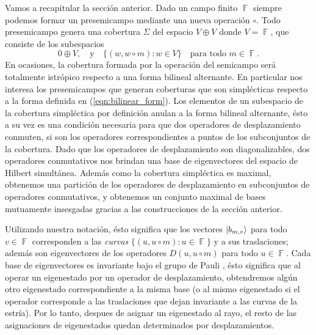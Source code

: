 \documentclass[a4paper,11pt]{report}
\DeclareMathOperator{\F}{\mathbb{F}}
\begin{document}
  Vamos a recapitular la sección anterior. Dado un campo
  finito $\F$ siempre podemos formar un presemicampo
  mediante una nueva operación $\circ$. Todo presemicampo
  genera una cobertura $\Sigma$ del espacio $V \oplus V$
  donde $V = \F$, que consiste de los subespacios
  \[
    0 \oplus V,
    \quad
    \text{y}
    \quad
    \{(w, w \circ m) : w \in V\} 
    \quad \text{para todo } m \in \F.
  \] 
  En ocasiones, la cobertura formada por la operación del
  semicampo será totalmente istrópico respecto a una forma
  bilineal alternante. En particular nos interesa los
  presemicampos que generan coberturas que son simplécticas
  respecto a la forma definida en (\ref{eqn:bilinear_form}).
  Los elementos de un subespacio de la cobertura simpléctica
  por definición anulan a la forma bilineal alternante, ésto
  a su vez es una condición necesaria para que dos
  operadores de desplazamiento conmuten, si son los
  operadores correspondientes a puntos de los subconjuntos
  de la cobertura.  Dado que los operadores de
  desplazamiento son diagonalizables, dos operadores
  conmutativos nos brindan una base de eigenvectores del
  espacio de Hilbert simultánea. Además como la cobertura
  simpléctica es maximal, obtenemos una partición de los
  operadores de desplazamiento en subconjuntos de operadores
  conmutativos, y obtenemos un conjunto maximal de bases
  mutuamente insesgadas gracias a las construcciones de la
  sección anterior.

  Utilizando nuestra notación, ésto significa que los
  vectores $\ket{b_{m,v}}$ para todo $v \in \F$ corresponden
  a las \textit{curvas} $\{(u, u \circ m) : u \in \F\}$ y a
  sus traslaciones; además son eigenvectores de los
  operadores $D(u, u \circ m)$ para todo $u \in \F$. Cada
  base de eigenvectores es invariante bajo el grupo de
  Pauli \cite{calderbank1997}, ésto significa que al operar un
  eigenestado por un operador de desplazamiento, obtendremos
  algún otro eigenestado correspondiente a la misma base (o
  al mismo eigenestado si el operador corresponde a las
  traslaciones que dejan invariante a las curvas de la
  estría). Por lo tanto, despues de asignar un eigenestado
  al rayo, el resto de las asignaciones de eigenestados
  quedan determinados por desplazamientos.
\end{document}

